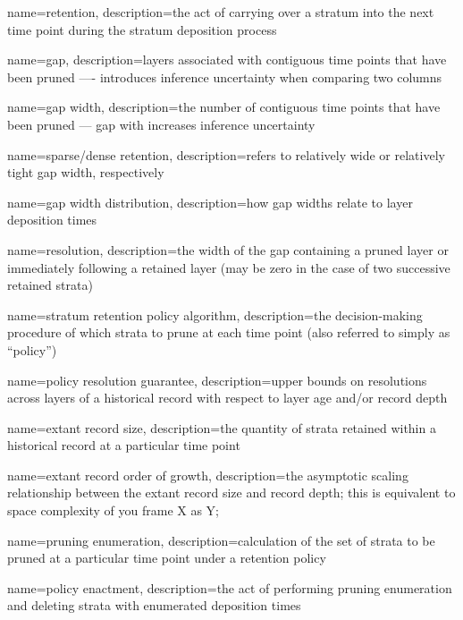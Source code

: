 {
    name=retention,
    description={the act of carrying over a stratum into the next time point during the stratum deposition process}
}

{
    name=gap,
    description={layers associated with contiguous time points that have been pruned ---- introduces inference uncertainty when comparing two columns}
}

{
    name=gap width,
    description={the number of contiguous time points that have been pruned --- gap with increases inference uncertainty}
}

{
    name=sparse/dense retention,
    description={refers to relatively wide or relatively tight gap width, respectively}
}

{
    name=gap width distribution,
    description={how gap widths relate to layer deposition times}
}

{
    name=resolution,
    description={the width of the gap containing a pruned layer or immediately following a retained layer (may be zero in the case of two successive retained strata)}
}

{
    name=stratum retention policy algorithm,
    description={the decision-making procedure of which strata to prune at each time point (also referred to simply as ``policy'')}
}

{
    name=policy resolution guarantee,
    description={upper bounds on resolutions across layers of a historical record with respect to layer age and/or record depth}
}

{
    name=extant record size,
    description={the quantity of strata retained within a historical record at a particular time point}
}

{
    name=extant record order of growth,
    description={the asymptotic scaling relationship between the extant record size and record depth; this is equivalent to space complexity of you frame X as Y;}
}

{
    name=pruning enumeration,
    description={calculation of the set of strata to be pruned at a particular time point under a retention policy}
}

{
    name=policy enactment,
    description={the act of performing pruning enumeration and deleting strata with enumerated deposition times}
}

